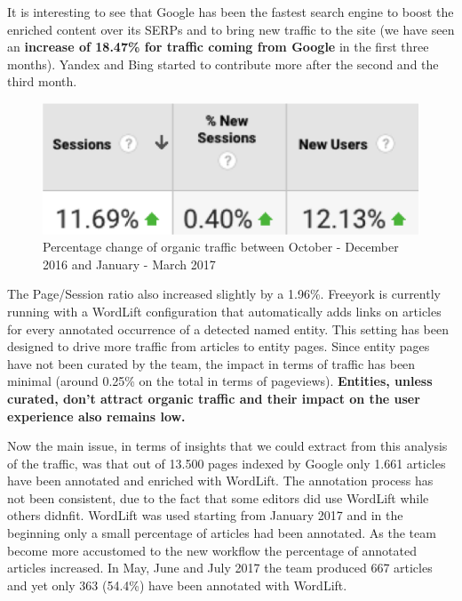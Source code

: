 \documentclass[runningheads,a4paper]{llncs}
\makeatletter
\def\maxwidth#1{\ifdim\Gin@nat@width>#1 #1\else\Gin@nat@width\fi}
\makeatother
\begin{document}
It is interesting to see that Google has been the fastest search
 engine to boost the enriched content over its SERPs and to bring
 new traffic to the site (we have seen an {\bf increase of 18.47\% for traffic coming from Google} in the first three months). Yandex
 and Bing started to contribute more after the second and the third
 month.
\begin{figure}[h!]
\centering
\includegraphics[width=\maxwidth{\textwidth}]{img/10000201000001C30000009D2BA22A09.png}
\cprotect\caption{Percentage change of organic traffic between October - December 2016 and January - March 2017}
\label{}
\end{figure}


The Page/Session ratio also increased slightly by a 1.96\%. Freeyork is currently running with a WordLift configuration that automatically adds links on articles for every annotated occurrence of a detected named entity. This setting has been designed to drive more
 traffic from articles to entity pages. Since entity pages have not
 been curated by the team, the impact in terms of traffic has been
minimal (around 0.25\% on the total in terms of pageviews). {\bf Entities, unless curated, don't attract organic traffic and their impact on the user experience also remains low. }

Now the main issue, in terms of insights that we could extract
 from this analysis of the traffic, was that out of 13.500 pages indexed
 by Google only 1.661 articles have been annotated and enriched
with WordLift. The annotation process has not been consistent, due
 to the fact that some editors did use WordLift while others didnfit.
 WordLift was used starting from January 2017 and in the beginning
 only a small percentage of articles had been annotated. As the team
 become more accustomed to the new workflow the percentage of
 annotated articles increased. In May, June and July 2017 the team
 produced 667 articles and yet only 363 (54.4\%) have been annotated
 with WordLift.
\end{document}

